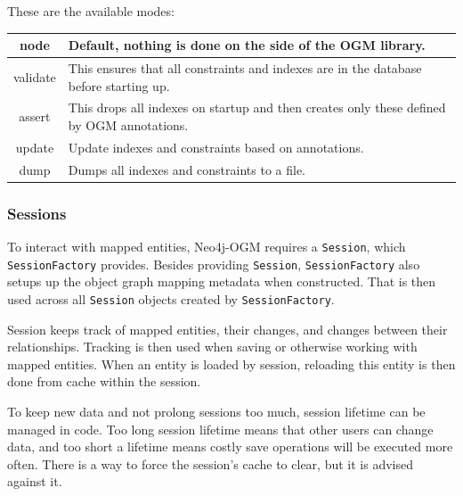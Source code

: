 These are the available modes:
\begin{table}[H]
    \begin{center}
        \begin{tabularx}{\textwidth}{|c|p{}|}
            \hline
            node     & Default, nothing is done on the side of the OGM library.                                  \\
            \hline
            validate & This ensures that all constraints and indexes are in the database before starting up.     \\
            \hline
            assert   & This drops all indexes on startup and then creates only these defined by OGM annotations. \\
            \hline
            update   & Update indexes and constraints based on annotations.                                      \\
            \hline
            dump     & Dumps all indexes and constraints to a file.                                              \\
            \hline
        \end{tabularx}
    \end{center}
\end{table}

\subsubsection{Sessions}
To interact with mapped entities, Neo4j-OGM requires a \texttt{Session}, which \texttt{SessionFactory} provides. Besides providing \texttt{Session}, \texttt{SessionFactory} also setups up the object graph mapping metadata when constructed. That is then used across all \texttt{Session} objects created by \texttt{SessionFactory}.

Session keeps track of mapped entities, their changes, and changes between their relationships. Tracking is then used when saving or otherwise working with mapped entities. When an entity is loaded by session, reloading this entity is then done from cache within the session.

To keep new data and not prolong sessions too much, session lifetime can be managed in code. Too long session lifetime means that other users can change data, and too short a lifetime means costly save operations will be executed more often. There is a way to force the session's cache to clear, but it is advised against it.

